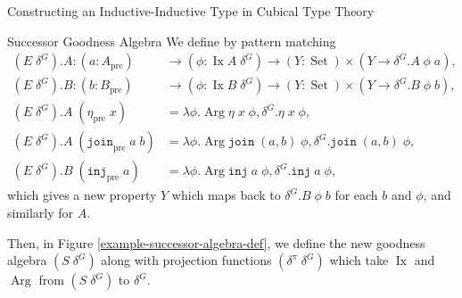 \documentclass[runningheads]{llncs}
\DeclareMathOperator{\USet}{Set}
\DeclareMathOperator{\Arg}{Arg}
\DeclareMathOperator{\Ix}{Ix}
\newcommand{\pre}[1]{{#1}_\text{pre}}
\newcommand{\join}{\texttt{join}}
\newcommand{\inj}{\texttt{inj}}
\begin{document}
\begin{section}{Constructing an Inductive-Inductive Type in Cubical Type Theory}
\begin{subsection}{Successor Goodness Algebra}
We define by pattern matching \begin{align*}
(E\;\delta^G).A : (a : \pre{A}) &\to (\phi : \Ix A\;\delta^G) \to (Y : \USet) \times (Y \to \delta^G.A\;\phi\;a),\\
(E\;\delta^G).B : (b : \pre{B}) &\to (\phi : \Ix B\;\delta^G) \to (Y : \USet) \times (Y \to \delta^G.B\;\phi\;b),\\
(E\;\delta^G).A\;(\pre{\eta}\;x) &= \lambda \phi. \Arg\eta\;x\;\phi, \delta^G.\eta\;x\;\phi,\\
(E\;\delta^G).A\;(\pre{\join}\;a\;b) &= \lambda \phi. \Arg\join\;(a, b)\;\phi, \delta^G.\join\;(a, b)\;\phi,\\
(E\;\delta^G).B\;(\pre{\inj}\;a) &= \lambda \phi. \Arg\inj\;a\;\phi, \delta^G.\inj\;a\;\phi,
\end{align*}
which gives a new property $Y$ which maps back to $\delta^G.B\;\phi\;b$ for each $b$ and $\phi$, and similarly for $A$.

Then, in Figure \ref{example-successor-algebra-def}, we define the new goodness algebra $(S\;\delta^G)$ along with projection functions $(\delta^\pi\;\delta^G)$ which take $\Ix$ and $\Arg$ from $(S\;\delta^G)$ to $\delta^G$.

\begin{figure}[htpb]\begin{flushleft}


\end{flushleft}
\end{figure}
\end{subsection}
\end{section}
\end{document}

